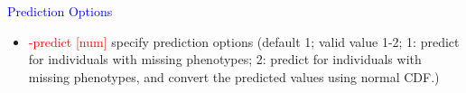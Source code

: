 \documentclass[11pt]{article}
\begin{document}
%
\textcolor{blue}{Prediction Options}
%
\begin{itemize}
\item  \textcolor{red}{-predict       [num]}     \quad          specify prediction options (default 1; valid value 1-2; 1: predict for individuals with missing phenotypes; 2: predict for individuals with missing phenotypes, and convert the predicted values using normal CDF.)
\end{itemize}
	
\clearpage


\end{document}
